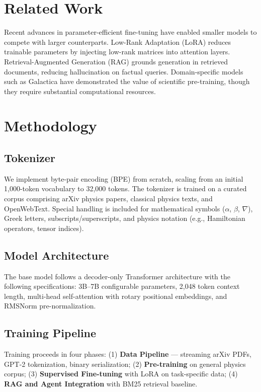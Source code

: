 \documentclass[11pt,a4paper]{article}
\begin{document}
\section{Related Work}

Recent advances in parameter-efficient fine-tuning have enabled smaller models to compete with larger counterparts. Low-Rank Adaptation (LoRA) \cite{hu2021lora} reduces trainable parameters by injecting low-rank matrices into attention layers. Retrieval-Augmented Generation (RAG) \cite{lewis2020retrieval} grounds generation in retrieved documents, reducing hallucination on factual queries. Domain-specific models such as Galactica \cite{taylor2022galactica} have demonstrated the value of scientific pre-training, though they require substantial computational resources.

\section{Methodology}

\subsection{Tokenizer}

We implement byte-pair encoding (BPE) from scratch, scaling from an initial 1,000-token vocabulary to 32,000 tokens. The tokenizer is trained on a curated corpus comprising arXiv physics papers, classical physics texts, and OpenWebText. Special handling is included for mathematical symbols ($\alpha$, $\beta$, $\nabla$), Greek letters, subscripts/superscripts, and physics notation (e.g., Hamiltonian operators, tensor indices).

\subsection{Model Architecture}

The base model follows a decoder-only Transformer architecture with the following specifications: 3B--7B configurable parameters, 2,048 token context length, multi-head self-attention with rotary positional embeddings, and RMSNorm pre-normalization.

\subsection{Training Pipeline}

Training proceeds in four phases: (1) \textbf{Data Pipeline} --- streaming arXiv PDFs, GPT-2 tokenization, binary serialization; (2) \textbf{Pre-training} on general physics corpus; (3) \textbf{Supervised Fine-tuning} with LoRA on task-specific data; (4) \textbf{RAG and Agent Integration} with BM25 retrieval baseline.
\end{document}
